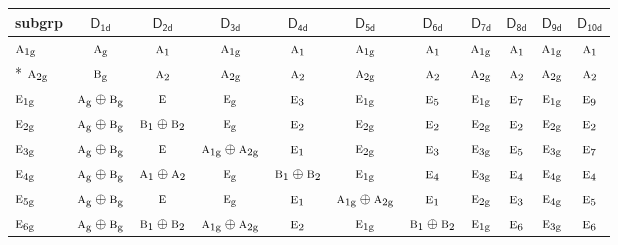 \documentclass[10pt,a4paper]{article}
\numberwithin{equation}{section}
\newcommand{\grp}[1]{\mathsf{#1}}
\newcommand{\irr}[1]{\text{\normalfont\scshape #1}}
\newcommand{\ptag}[1]{\mathrm{#1}}
\begin{document}
{\small\begin{longtable}{@{}lcccccccccc@{}}\toprule
subgrp & \href{D1d.pdf}{$\grp{D_{1d}}$} & \href{D2d.pdf}{$\grp{D_{2d}}$} & \href{D3d.pdf}{$\grp{D_{3d}}$} & \href{D4d.pdf}{$\grp{D_{4d}}$} & \href{D5d.pdf}{$\grp{D_{5d}}$} & \href{D6d.pdf}{$\grp{D_{6d}}$} & \href{D7d.pdf}{$\grp{D_{7d}}$} & \href{D8d.pdf}{$\grp{D_{8d}}$} & \href{D9d.pdf}{$\grp{D_{9d}}$} & \href{D10d.pdf}{$\grp{D_{10d}}$}\\\midrule\endhead
\bottomrule\endfoot\endlastfoot
$\irr{a}_{1\ptag{g}}$ & $\irr{a}_{\ptag{g}}$ & $\irr{a}_{1}$ & $\irr{a}_{1\ptag{g}}$ & $\irr{a}_{1}$ & $\irr{a}_{1\ptag{g}}$ & $\irr{a}_{1}$ & $\irr{a}_{1\ptag{g}}$ & $\irr{a}_{1}$ & $\irr{a}_{1\ptag{g}}$ & $\irr{a}_{1}$\\*
$\irr{a}_{2\ptag{g}}$ & $\irr{b}_{\ptag{g}}$ & $\irr{a}_{2}$ & $\irr{a}_{2\ptag{g}}$ & $\irr{a}_{2}$ & $\irr{a}_{2\ptag{g}}$ & $\irr{a}_{2}$ & $\irr{a}_{2\ptag{g}}$ & $\irr{a}_{2}$ & $\irr{a}_{2\ptag{g}}$ & $\irr{a}_{2}$\\
$\irr{e}_{1\ptag{g}}$ & $\irr{a}_{\ptag{g}}\oplus \irr{b}_{\ptag{g}}$ & $\irr{e}$ & $\irr{e}_{\ptag{g}}$ & $\irr{e}_{3}$ & $\irr{e}_{1\ptag{g}}$ & $\irr{e}_{5}$ & $\irr{e}_{1\ptag{g}}$ & $\irr{e}_{7}$ & $\irr{e}_{1\ptag{g}}$ & $\irr{e}_{9}$\\
$\irr{e}_{2\ptag{g}}$ & $\irr{a}_{\ptag{g}}\oplus \irr{b}_{\ptag{g}}$ & $\irr{b}_{1}\oplus \irr{b}_{2}$ & $\irr{e}_{\ptag{g}}$ & $\irr{e}_{2}$ & $\irr{e}_{2\ptag{g}}$ & $\irr{e}_{2}$ & $\irr{e}_{2\ptag{g}}$ & $\irr{e}_{2}$ & $\irr{e}_{2\ptag{g}}$ & $\irr{e}_{2}$\\
$\irr{e}_{3\ptag{g}}$ & $\irr{a}_{\ptag{g}}\oplus \irr{b}_{\ptag{g}}$ & $\irr{e}$ & $\irr{a}_{1\ptag{g}}\oplus \irr{a}_{2\ptag{g}}$ & $\irr{e}_{1}$ & $\irr{e}_{2\ptag{g}}$ & $\irr{e}_{3}$ & $\irr{e}_{3\ptag{g}}$ & $\irr{e}_{5}$ & $\irr{e}_{3\ptag{g}}$ & $\irr{e}_{7}$\\
$\irr{e}_{4\ptag{g}}$ & $\irr{a}_{\ptag{g}}\oplus \irr{b}_{\ptag{g}}$ & $\irr{a}_{1}\oplus \irr{a}_{2}$ & $\irr{e}_{\ptag{g}}$ & $\irr{b}_{1}\oplus \irr{b}_{2}$ & $\irr{e}_{1\ptag{g}}$ & $\irr{e}_{4}$ & $\irr{e}_{3\ptag{g}}$ & $\irr{e}_{4}$ & $\irr{e}_{4\ptag{g}}$ & $\irr{e}_{4}$\\
$\irr{e}_{5\ptag{g}}$ & $\irr{a}_{\ptag{g}}\oplus \irr{b}_{\ptag{g}}$ & $\irr{e}$ & $\irr{e}_{\ptag{g}}$ & $\irr{e}_{1}$ & $\irr{a}_{1\ptag{g}}\oplus \irr{a}_{2\ptag{g}}$ & $\irr{e}_{1}$ & $\irr{e}_{2\ptag{g}}$ & $\irr{e}_{3}$ & $\irr{e}_{4\ptag{g}}$ & $\irr{e}_{5}$\\
$\irr{e}_{6\ptag{g}}$ & $\irr{a}_{\ptag{g}}\oplus \irr{b}_{\ptag{g}}$ & $\irr{b}_{1}\oplus \irr{b}_{2}$ & $\irr{a}_{1\ptag{g}}\oplus \irr{a}_{2\ptag{g}}$ & $\irr{e}_{2}$ & $\irr{e}_{1\ptag{g}}$ & $\irr{b}_{1}\oplus \irr{b}_{2}$ & $\irr{e}_{1\ptag{g}}$ & $\irr{e}_{6}$ & $\irr{e}_{3\ptag{g}}$ & $\irr{e}_{6}$\\

\end{longtable}}
\end{document}
